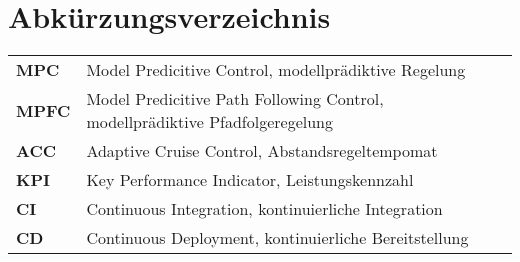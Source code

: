
\begingroup 
\let\clearpage\relax
\let\cleardoublepage\relax
\let\cleardoublepage\relax

\chapter*{Abkürzungsverzeichnis}
\thispagestyle{empty}
\vspace{-.5em} %
\begin{tabular}{@{} p{\figurelabelwidth} @{} p{\textwidth-\figurelabelwidth}}
\textbf{MPC} & Model Predicitive Control, modellprädiktive Regelung\\
\textbf{MPFC} & Model Predicitive Path Following Control, modellprädiktive Pfadfolgeregelung\\
\textbf{ACC} & Adaptive Cruise Control, Abstandsregeltempomat\\
\textbf{KPI} & Key Performance Indicator, Leistungskennzahl\\
\textbf{CI} & Continuous Integration, kontinuierliche Integration\\
\textbf{CD} & Continuous Deployment, kontinuierliche Bereitstellung\\
\end{tabular}                
\endgroup
\cleardoublepage